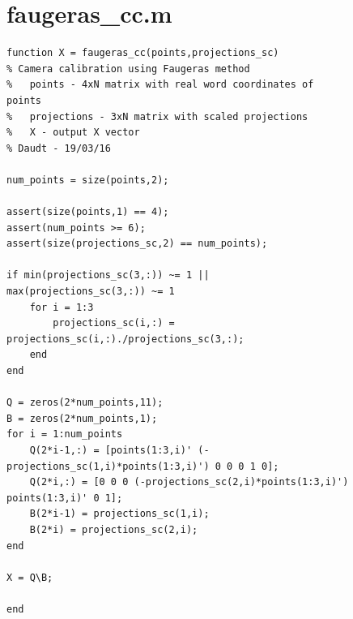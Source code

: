 \documentclass[journal]{IEEEtran}
\begin{document}
\begin{figure}[p]
\section{faugeras\_cc.m}\label{faugeras}
\begin{verbatim}
function X = faugeras_cc(points,projections_sc)
% Camera calibration using Faugeras method
%   points - 4xN matrix with real word coordinates of points
%   projections - 3xN matrix with scaled projections
%   X - output X vector
% Daudt - 19/03/16

num_points = size(points,2);

assert(size(points,1) == 4);
assert(num_points >= 6);
assert(size(projections_sc,2) == num_points);

if min(projections_sc(3,:)) ~= 1 || max(projections_sc(3,:)) ~= 1
    for i = 1:3
        projections_sc(i,:) = projections_sc(i,:)./projections_sc(3,:);
    end
end

Q = zeros(2*num_points,11);
B = zeros(2*num_points,1);
for i = 1:num_points
    Q(2*i-1,:) = [points(1:3,i)' (-projections_sc(1,i)*points(1:3,i)') 0 0 0 1 0];
    Q(2*i,:) = [0 0 0 (-projections_sc(2,i)*points(1:3,i)') points(1:3,i)' 0 1];
    B(2*i-1) = projections_sc(1,i);
    B(2*i) = projections_sc(2,i);
end

X = Q\B;

end
\end{verbatim}
\end{figure}

%
%
\end{document}
